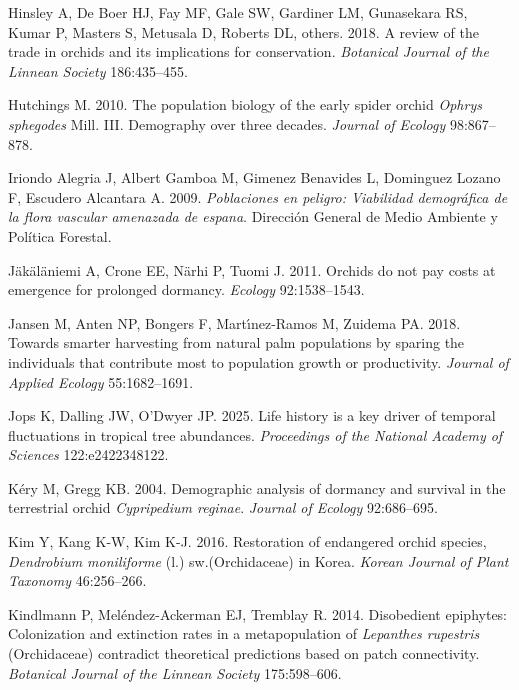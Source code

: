\documentclass[
  12pt,
  letterpaper,
]{book}
\newlength{\cslhangindent}
\newenvironment{CSLReferences}[2] %
 {\begin{list}{}{%
  \setlength{\itemindent}{0pt}
  \setlength{\leftmargin}{0pt}
  \setlength{\parsep}{0pt}
  \ifodd #1
   \setlength{\leftmargin}{\cslhangindent}
   \setlength{\itemindent}{-1\cslhangindent}
  \fi
  \setlength{\itemsep}{#2\baselineskip}}}
 {\end{list}}
\begin{document}
\begin{CSLReferences}{1}{0}
Hinsley A, De Boer HJ, Fay MF, Gale SW, Gardiner LM, Gunasekara RS,
Kumar P, Masters S, Metusala D, Roberts DL, others. 2018. A review of
the trade in orchids and its implications for conservation.
\emph{Botanical Journal of the Linnean Society} 186:435--455.

Hutchings M. 2010. The population biology of the early spider orchid
\emph{{O}phrys {s}phegodes} {M}ill. III. Demography over three decades.
\emph{Journal of Ecology} 98:867--878.

Iriondo Alegria J, Albert Gamboa M, Gimenez Benavides L, Dominguez
Lozano F, Escudero Alcantara A. 2009. \emph{Poblaciones en peligro:
Viabilidad demogr{á}fica de la flora vascular amenazada de espana}.
Direcci{ó}n General de Medio Ambiente y Pol{í}tica Forestal.

Jäkäläniemi A, Crone EE, Närhi P, Tuomi J. 2011. Orchids do not pay
costs at emergence for prolonged dormancy. \emph{Ecology} 92:1538--1543.

Jansen M, Anten NP, Bongers F, Martı́nez-Ramos M, Zuidema PA. 2018.
Towards smarter harvesting from natural palm populations by sparing the
individuals that contribute most to population growth or productivity.
\emph{Journal of Applied Ecology} 55:1682--1691.

Jops K, Dalling JW, O'Dwyer JP. 2025. Life history is a key driver of
temporal fluctuations in tropical tree abundances. \emph{Proceedings of
the National Academy of Sciences} 122:e2422348122.

Kéry M, Gregg KB. 2004. Demographic analysis of dormancy and survival in
the terrestrial orchid \emph{{C}ypripedium {r}eginae}. \emph{Journal of
Ecology} 92:686--695.

Kim Y, Kang K-W, Kim K-J. 2016. Restoration of endangered orchid
species, \emph{{D}endrobium {m}oniliforme} (l.) sw.({O}rchidaceae) in
{K}orea. \emph{Korean Journal of Plant Taxonomy} 46:256--266.

Kindlmann P, Meléndez-Ackerman EJ, Tremblay R. 2014. Disobedient
epiphytes: Colonization and extinction rates in a metapopulation of
\emph{{L}epanthes {r}upestris} ({O}rchidaceae) contradict theoretical
predictions based on patch connectivity. \emph{Botanical Journal of the
Linnean Society} 175:598--606.


\end{CSLReferences}
\end{document}

